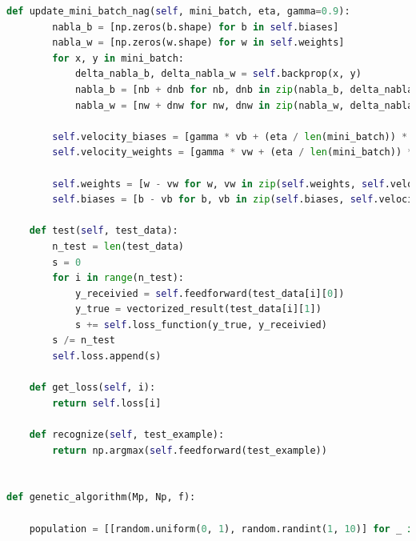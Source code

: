 \documentclass[a4paper, 14pt]{extarticle}
\begin{document}
\begin{lstlisting}[language={python},caption={Методы оптимизации на примере многослойного персептрона, генетический алгоритм},label={lst:code1}]
    def update_mini_batch_nag(self, mini_batch, eta, gamma=0.9):
        nabla_b = [np.zeros(b.shape) for b in self.biases]
        nabla_w = [np.zeros(w.shape) for w in self.weights]
        for x, y in mini_batch:
            delta_nabla_b, delta_nabla_w = self.backprop(x, y)
            nabla_b = [nb + dnb for nb, dnb in zip(nabla_b, delta_nabla_b)]
            nabla_w = [nw + dnw for nw, dnw in zip(nabla_w, delta_nabla_w)]

        self.velocity_biases = [gamma * vb + (eta / len(mini_batch)) * nb for vb, nb in zip(self.velocity_biases, nabla_b)]
        self.velocity_weights = [gamma * vw + (eta / len(mini_batch)) * nw for vw, nw in zip(self.velocity_weights, nabla_w)]

        self.weights = [w - vw for w, vw in zip(self.weights, self.velocity_weights)]
        self.biases = [b - vb for b, vb in zip(self.biases, self.velocity_biases)]

    def test(self, test_data):
        n_test = len(test_data)
        s = 0
        for i in range(n_test):
            y_receivied = self.feedforward(test_data[i][0])
            y_true = vectorized_result(test_data[i][1])
            s += self.loss_function(y_true, y_receivied)
        s /= n_test
        self.loss.append(s)

    def get_loss(self, i):
        return self.loss[i]

    def recognize(self, test_example):
        return np.argmax(self.feedforward(test_example))


def genetic_algorithm(Mp, Np, f):

    population = [[random.uniform(0, 1), random.randint(1, 10)] for _ in range(Mp)]


\end{lstlisting}
\end{document}
